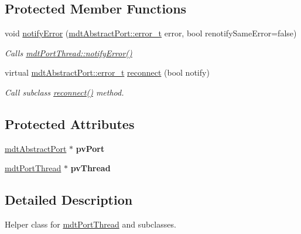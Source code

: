 \subsection*{Protected Member Functions}
\begin{DoxyCompactItemize}
\item 
void \hyperlink{classmdt_port_thread_helper_aaa98db16bfcc30d82e9d542fc2a52d6b}{notifyError} (\hyperlink{classmdt_abstract_port_ad4121bb930c95887e77f8bafa065a85e}{mdtAbstractPort::error\_\-t} error, bool renotifySameError=false)
\begin{DoxyCompactList}\small\item\em Calls \hyperlink{classmdt_port_thread_a30bdd11ef16d4f3321921c9d9b26399d}{mdtPortThread::notifyError()} \end{DoxyCompactList}\item 
virtual \hyperlink{classmdt_abstract_port_ad4121bb930c95887e77f8bafa065a85e}{mdtAbstractPort::error\_\-t} \hyperlink{classmdt_port_thread_helper_a1d0874434ae6442610e2bc685be6458f}{reconnect} (bool notify)
\begin{DoxyCompactList}\small\item\em Call subclass \hyperlink{classmdt_port_thread_helper_a1d0874434ae6442610e2bc685be6458f}{reconnect()} method. \end{DoxyCompactList}\end{DoxyCompactItemize}
\subsection*{Protected Attributes}
\begin{DoxyCompactItemize}
\item 
\hypertarget{classmdt_port_thread_helper_ada4497db38cb418c2021aecaf4caa36c}{
\hyperlink{classmdt_abstract_port}{mdtAbstractPort} $\ast$ {\bfseries pvPort}}
\label{classmdt_port_thread_helper_ada4497db38cb418c2021aecaf4caa36c}

\item 
\hypertarget{classmdt_port_thread_helper_a44780de0f664de18ca999ef43321c525}{
\hyperlink{classmdt_port_thread}{mdtPortThread} $\ast$ {\bfseries pvThread}}
\label{classmdt_port_thread_helper_a44780de0f664de18ca999ef43321c525}

\end{DoxyCompactItemize}


\subsection{Detailed Description}
Helper class for \hyperlink{classmdt_port_thread}{mdtPortThread} and subclasses. 

